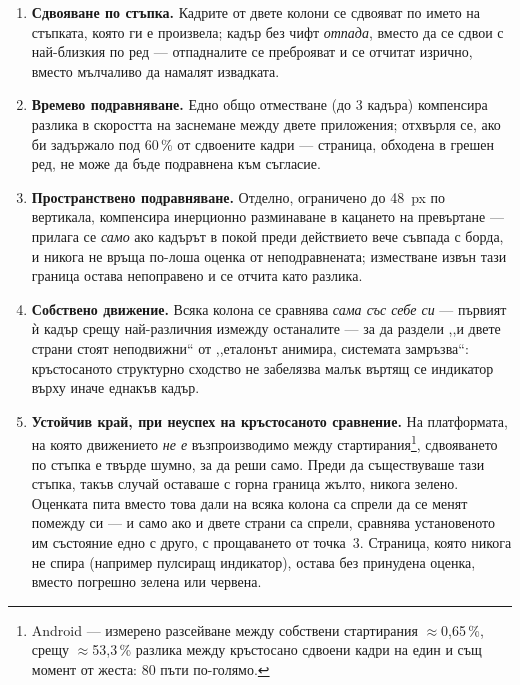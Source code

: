 \begin{enumerate}[topsep=2pt,itemsep=1pt,leftmargin=*]
\item \textbf{Сдвояване по стъпка.} Кадрите от двете колони се сдвояват по името на
      стъпката, която ги е произвела; кадър без чифт \emph{отпада}, вместо да се
      сдвои с най-близкия по ред --- отпадналите се преброяват и се отчитат изрично,
      вместо мълчаливо да намалят извадката.
\item \textbf{Времево подравняване.} Едно общо отместване (до 3 кадъра) компенсира
      разлика в скоростта на заснемане между двете приложения; отхвърля се, ако би
      задържало под 60\,\% от сдвоените кадри --- страница, обходена в грешен ред, не
      може да бъде подравнена към съгласие.
\item \textbf{Пространствено подравняване.} Отделно, ограничено до 48~px по вертикала,
      компенсира инерционно разминаване в кацането на превъртане --- прилага се
      \emph{само} ако кадърът в покой преди действието вече съвпада с борда, и никога
      не връща по-лоша оценка от неподравнената; изместване извън тази граница остава
      непоправено и се отчита като разлика.
\item \textbf{Собствено движение.} Всяка колона се сравнява \emph{сама със себе си}
      --- първият ѝ кадър срещу най-различния измежду останалите --- за да раздели
      ,,и двете страни стоят неподвижни“ от ,,еталонът анимира, системата замръзва“:
      кръстосаното структурно сходство не забелязва малък въртящ се индикатор върху
      иначе еднакъв кадър.
\item \textbf{Устойчив край, при неуспех на кръстосаното сравнение.} На платформата,
      на която движението \emph{не е} възпроизводимо между стартирания\footnote{Android
      --- измерено разсейване между собствени стартирания $\approx$0,65\,\%, срещу
      $\approx$53{,}3\,\% разлика между кръстосано сдвоени кадри на един и същ момент от
      жеста: 80 пъти по-голямо.}, сдвояването по стъпка е твърде шумно, за да реши
      само. Преди да съществуваше тази стъпка, такъв случай оставаше с горна граница
      жълто, никога зелено. Оценката пита вместо това дали 
      на всяка колона са спрели да се менят помежду си --- и само ако и двете страни са
      спрели, сравнява установеното им състояние едно с друго, с прощаването от точка~3.
      Страница, която никога не спира (например пулсиращ индикатор), остава без
      принудена оценка, вместо погрешно зелена или червена.
\end{enumerate}

